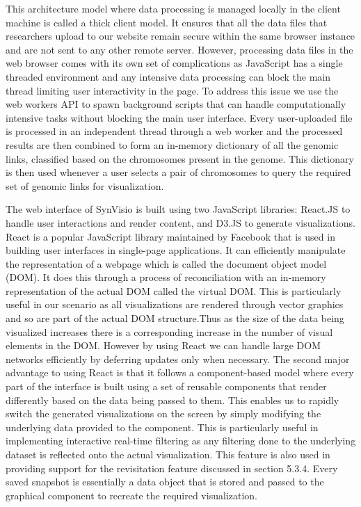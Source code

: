 This architecture model where data processing is managed locally in the client machine is called a thick client model. It ensures that all the data files that researchers upload to our website remain secure within the same browser instance and are not sent to any other remote server. However, processing data files in the web browser comes with its own set of complications as JavaScript has a single threaded environment and any intensive data processing can block the main thread limiting user interactivity in the page. To address this issue we use the web workers API to spawn background scripts that can handle computationally intensive tasks without blocking the main user interface\cite{webworkers}. Every user-uploaded file is processed in an independent thread through a web worker and the processed results are then combined to form an in-memory dictionary of all the genomic links, classified based on the chromosomes present in the genome. This dictionary is then used whenever a user selects a pair of chromosomes to query the required set of genomic links for visualization.

The web interface of SynVisio is built using two JavaScript libraries: React.JS\cite{react} to handle user interactions and render content, and D3.JS\cite{d3js} to generate visualizations.
React is a popular JavaScript library maintained by Facebook\cite{facebook} that is used in building user interfaces in single-page applications. It can efficiently manipulate the representation of a webpage which is called the document object model (DOM). It does this through a process of reconciliation with an in-memory representation of the actual DOM called the virtual DOM. This is particularly useful in our scenario as all visualizations are rendered through vector graphics and so are part of the actual DOM structure.Thus as the size of the data being visualized increases there is a corresponding increase in the number of visual elements in the DOM. However by using React we can handle large DOM networks efficiently by deferring updates only when necessary. The second major advantage to using React is that it follows a component-based model where every part of the interface is built using a set of reusable components that render differently based on the data being passed to them. This enables us to rapidly switch the generated visualizations on the screen by simply modifying the underlying data provided to the component. This is particularly useful in implementing interactive real-time filtering as any filtering done to the underlying dataset is reflected onto the actual visualization. This feature is also used in providing support for the revisitation feature discussed in section 5.3.4. Every saved snapshot is essentially a data object that is stored and passed to the graphical component to recreate the required visualization.

